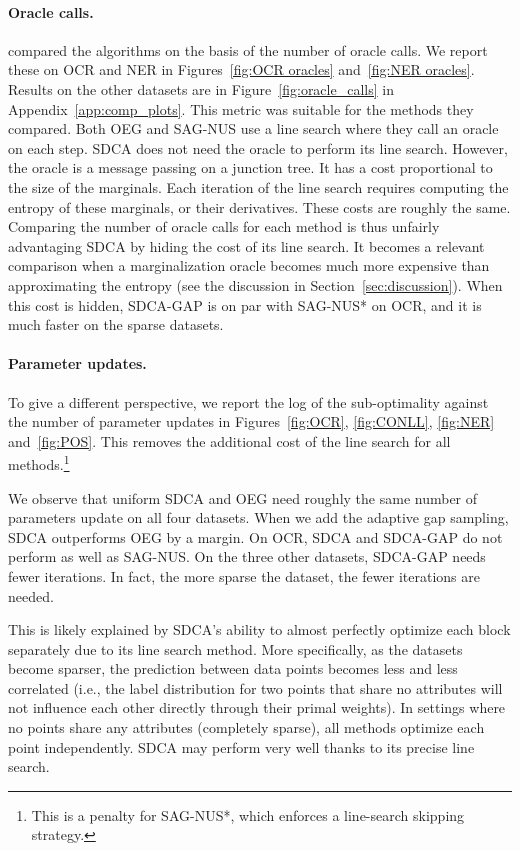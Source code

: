 \paragraph{Oracle calls.}
\citet{schmidt2015non} compared the algorithms on the basis of the number of oracle calls.
We report these on OCR and NER in Figures~\ref{fig:OCR oracles} and~\ref{fig:NER oracles}.
Results on the other datasets are in Figure~\ref{fig:oracle_calls} in Appendix~\ref{app:comp_plots}.
This metric was suitable for the methods they compared.
Both OEG and SAG-NUS use a line search where they call an oracle on each step.
SDCA does not need the oracle to perform its line search.
However, the oracle is a message passing on a junction tree.
It has a cost proportional to the size of the marginals.
Each iteration of the line search requires computing the entropy of these marginals, or their derivatives.
These costs are roughly the same.
Comparing the number of oracle calls for each method is thus unfairly advantaging SDCA by hiding the cost of its line search.
It becomes a relevant comparison when a marginalization oracle becomes much more expensive than approximating the entropy (see the discussion in Section~\ref{sec:discussion}).
When this cost is hidden, SDCA-GAP is on par with SAG-NUS* on OCR, and it is much faster on the sparse datasets.

\paragraph{Parameter updates.}
To give a different perspective, we report the log of the sub-optimality against the number of parameter updates in Figures~\ref{fig:OCR}, \ref{fig:CONLL}, \ref{fig:NER} and~\ref{fig:POS}.
This removes the additional cost of the line search for all methods.\footnote{
	This is a penalty for SAG-NUS*, which enforces a line-search skipping strategy.
}

We observe that uniform SDCA and OEG need roughly the same number of parameters update on all four datasets.
When we add the adaptive gap sampling, SDCA outperforms OEG by a margin.
On OCR, SDCA and SDCA-GAP do not perform as well as SAG-NUS.
On the three other datasets, SDCA-GAP needs fewer iterations.
In fact, the more sparse the dataset, the fewer iterations are needed.

This is likely explained by SDCA's ability to almost perfectly optimize each block separately due to its line search method.
More specifically, as the datasets become sparser, the prediction between data points becomes less and less correlated (i.e., the label distribution for two points that share no attributes will not influence each other directly through their primal weights).
In settings where no points share any attributes (completely sparse), all methods optimize each point independently.
SDCA  may perform very well thanks to its precise line search.

